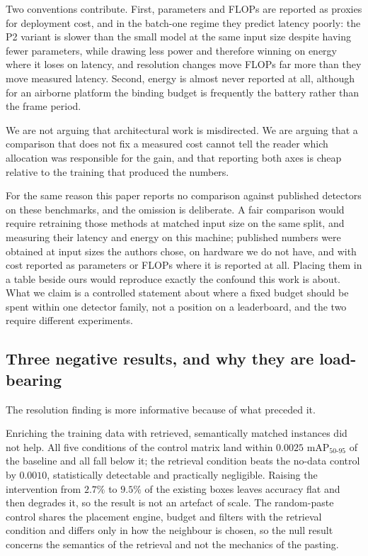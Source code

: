 Two conventions contribute. First, parameters and FLOPs are reported as proxies for
deployment cost, and in the batch-one regime they predict latency poorly: the P2 variant is
slower than the small model at the same input size despite having fewer parameters, while
drawing less power and therefore winning on energy where it loses on latency, and
resolution changes move FLOPs far more than they move measured latency. Second, energy is
almost never reported at all, although for an airborne platform the binding budget is
frequently the battery rather than the frame period.

We are not arguing that architectural work is misdirected. We are arguing that a comparison
that does not fix a measured cost cannot tell the reader which allocation was responsible
for the gain, and that reporting both axes is cheap relative to the training that produced
the numbers.

For the same reason this paper reports no comparison against published detectors on these
benchmarks, and the omission is deliberate. A fair comparison would require retraining
those methods at matched input size on the same split, and measuring their latency and
energy on this machine; published numbers were obtained at input sizes the authors chose,
on hardware we do not have, and with cost reported as parameters or FLOPs where it is
reported at all. Placing them in a table beside ours would reproduce exactly the confound
this work is about. What we claim is a controlled statement about where a fixed budget
should be spent within one detector family, not a position on a leaderboard, and the two
require different experiments.

\subsection{Three negative results, and why they are load-bearing}
\label{sec:discussion:negatives}

The resolution finding is more informative because of what preceded it.

Enriching the training data with retrieved, semantically matched instances did not help.
All five conditions of the control matrix land within $0.0025$ mAP$_{50\text{-}95}$ of the
baseline and all fall below it; the retrieval condition beats the no-data control by
$0.0010$, statistically detectable and practically negligible. Raising the intervention from
$2.7\%$ to $9.5\%$ of the existing boxes leaves accuracy flat and then degrades it, so the
result is not an artefact of scale. The random-paste control shares the placement engine,
budget and filters with the retrieval condition and differs only in how the neighbour is
chosen, so the null result concerns the semantics of the retrieval and not the mechanics of
the pasting.

